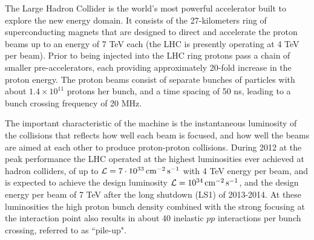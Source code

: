 The Large Hadron Collider is the world's most powerful accelerator
built to explore the new energy domain.  It consists of the
27-kilometers ring of superconducting magnets that are designed to
direct and accelerate the proton beams up to an energy of 7 TeV each
(the LHC is presently operating at 4 TeV per beam). Prior to being
injected into the LHC ring protons pass a chain of smaller
pre-accelerators, each providing approximately 20-fold increase in the
proton energy.
The proton beams consist of separate bunches of particles with about $1.4 
\times 10^{11}$ 
protons her bunch, and a time spacing of 50 ns, leading to a bunch 
crossing frequency of 20 MHz. 

The important characteristic of the machine is the instantaneous 
luminosity of the collisions
that reflects how well each beam is focused, and how well the
beams are aimed at each other to produce proton-proton collisions.
During 2012 at the peak performance the LHC operated at the highest
luminosities ever achieved at hadron colliders, of up 
to ${\cal L} = 7 \cdot 10^{33} \,\mathrm{cm}^{-2}\, \mathrm{s}^{-1}$ with 
4 TeV energy per beam, and is expected to achieve the design luminosity 
${\cal L} = 10^{34} \,\mathrm{cm}^{-2} \,\mathrm{s}^{-1}$, and the design 
energy per beam of 7 TeV
after the long shutdown (LS1) of 2013-2014. At these luminosities 
the high proton bunch density combined with the strong focusing at the 
interaction point also results 
in about 40 inelastic $pp$ interactions per bunch crossing, referred to as 
``pile-up". 

